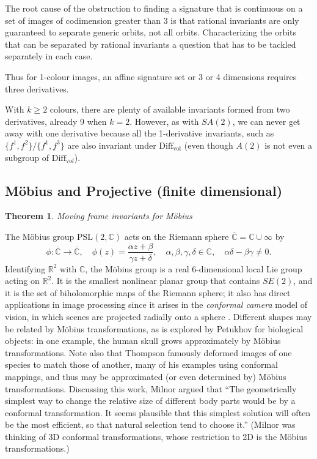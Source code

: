 \documentclass{article}
\newtheorem{theorem}{Theorem}
\def\R{\mathbb{R}}
\begin{document}
The root cause of the obstruction to finding a signature that is continuous on a set of images
of codimension greater than 3 is that rational invariants are only guaranteed
to separate generic orbits, not all orbits. Characterizing the orbits
that can be separated by rational invariants a question that
has to be tackled separately in each case.

Thus for 1-colour images, an affine signature set or 3 or 4 dimensions requires three derivatives.


With $k\ge 2$ colours, there are plenty of available invariants formed from  two derivatives, already 9 when $k=2$. 
However, as with $SA(2)$, we can never get away with one derivative because all the 1-derivative invariants,
such as $\{f^1,f^2\}/\{f^1,f^3\}$ 
are also invariant
under $\mathrm{Diff}_{\mathrm{vol}}$ (even though $A(2)$ is not even a subgroup of $\mathrm{Diff}_{\mathrm{vo}l}$).


\subsection{M\"obius and Projective (finite dimensional)}
\begin{theorem}
  Moving frame invariants for M\"obius
\end{theorem}

The M\"obius group $\mathrm{PSL}(2,\mathbb{C})$ acts on the Riemann sphere
$\overline{\mathbb{C}} = \mathbb{C}\cup\infty$ by 
$$ \phi\colon \overline{\mathbb{C}} \to \overline{\mathbb{C}},\quad \phi(z) = \frac{\alpha z + \beta}{\gamma z + \delta},\quad \alpha,\beta,\gamma,\delta\in\mathbb{C}, \quad
\alpha\delta-\beta\gamma\ne 0.$$
Identifying $\R^2$ with $\mathbb{C}$, the M\"obius group is a real 6-dimensional local Lie group acting on $\mathbb{R}^2$.
It is the smallest nonlinear planar group that contains $SE(2)$, and it is the set of biholomorphic maps of the Riemann sphere; it also has direct applications in image processing since it arises in the {\em conformal camera} model of vision, in which scenes are projected radially onto a sphere \cite{lenz1990group,turski2004geometric,turski2005geometric}. 
Different shapes may be related by M\"obius transformations, as is explored by
Petukhov \cite{petukhov1989non} for biological objects: in one example, the human skull grows approximately by M\"obius transformations.  Note also that Thompson \cite{thompson1942growth} famously deformed images of one species to match those of another, many of his examples using conformal mappings, and thus may be approximated (or even determined by) M\"obius transformations. Discussing this work, Milnor \cite{milnor2010growth}  argued that ``The geometrically simplest way to change the relative size of different body parts would be by a conformal transformation. It seems plausible that this simplest solution will often be the most efficient, so that natural selection tend to choose it.'' (Milnor was thinking of 3D conformal transformations, whose restriction to 2D is the M\"obius transformations.)
\end{document}
